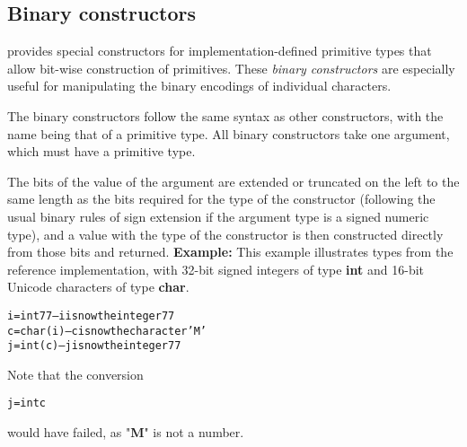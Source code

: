 \subsection{Binary constructors}\label{refbincon}
 
\nr{} provides special constructors for implementation-defined
primitive types that allow bit-wise construction of primitives.
These \emph{binary constructors} are especially useful for
manipulating the binary encodings of individual characters.
 
The binary constructors follow the same syntax as other constructors,
with the name being that of a primitive type.  All binary constructors
take one argument, which must have a primitive type.
 
The bits of the value of the argument are extended or truncated on the
left to the same length as the bits required for the type of the
constructor (following the usual binary rules of sign extension if the
argument type is a signed numeric type), and a value with the type of
the constructor is then constructed directly from those bits and
returned.
 \textbf{Example:}
 This example illustrates types from the reference implementation,
with 32-bit signed integers of type \textbf{int} and 16-bit Unicode
characters of type \textbf{char}.
\begin{alltt}
i=int 77   -- i is now the integer 77
c=char(i)  -- c is now the character 'M'
j=int(c)   -- j is now the integer 77
\end{alltt}
Note that the conversion
\begin{alltt}
j=int c
\end{alltt}
would have failed, as "\textbf{M}" is not a number.
